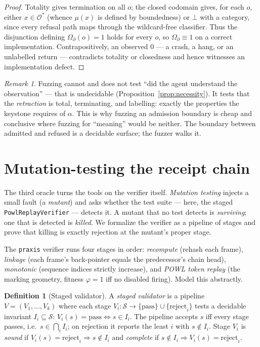 \documentclass[11pt,oneside]{book}
\theoremstyle{definition}
\newtheorem{definition}{Definition}[chapter]
\theoremstyle{plain}
\theoremstyle{remark}
\newtheorem*{remark}{Remark}
\newcommand{\Adm}{\mathcal{O}^{*}}             %
\newcommand{\muop}{\mu}                        %
\newcommand{\adm}{\alpha}                      %
\newcommand{\Rfsl}{\bot}                        %
\newcommand{\Fitness}{\varphi}
\newcommand{\code}[1]{\texttt{#1}}
\begin{document}
\begin{proof}
Totality gives termination on all $o$; the closed codomain gives, for each $o$, either $x\in\Adm$ (whence $\muop(x)$ is defined by boundedness) or $\Rfsl$ with a category, since every refusal path maps through the wildcard-free classifier. %
Thus the disjunction defining $\Omega_\partial(o)=1$ holds for every $o$, so $\Omega_\partial\equiv 1$ on a correct implementation. %
Contrapositively, an observed $0$ --- a crash, a hang, or an unlabelled return --- contradicts totality or closedness and hence witnesses an implementation defect. %
\end{proof}

\begin{remark}
Fuzzing cannot and does not test ``did the agent understand the observation'' --- that is undecidable (Proposition~\ref{prop:necessity}). %
It tests that the \emph{retraction} is total, terminating, and labelling: exactly the properties the keystone requires of $\adm$. %
This is why fuzzing an admission boundary is cheap and conclusive where fuzzing for ``meaning'' would be neither. %
The boundary between admitted and refused is a decidable surface; the fuzzer walks it. %
\end{remark}

\section{Mutation-testing the receipt chain}
The third oracle turns the tools on the verifier itself. %
\emph{Mutation testing} \cite{demillo1978,jia2011} injects a small fault (a \emph{mutant}) and asks whether the test suite --- here, the staged \code{PowlReplayVerifier} --- detects it. %
A mutant that no test detects is \emph{surviving}; one that is detected is \emph{killed}. %
We formalize the verifier as a pipeline of stages and prove that killing is exactly rejection at the mutant's proper stage. %

The \code{praxis} verifier runs four stages in order: \emph{recompute} (rehash each frame), \emph{linkage} (each frame's back-pointer equals the predecessor's chain head), \emph{monotonic} (sequence indices strictly increase), and \emph{POWL token replay} (the marking geometry, fitness $\Fitness=1$ iff no disabled firing). %
Model this abstractly. %

\begin{definition}[Staged validator]\label{def:staged}
A \emph{staged validator} is a pipeline $V=(V_1,\dots,V_k)$ where each stage $V_i:\mathcal{S}\to\{\text{pass}\}\cup\{\text{reject}_i\}$ tests a decidable invariant $I_i\subseteq\mathcal{S}$: $V_i(s)=\text{pass}\iff s\in I_i$. %
The pipeline accepts $s$ iff every stage passes, i.e.\ $s\in\bigcap_i I_i$; on rejection it reports the least $i$ with $s\notin I_i$. %
Stage $V_i$ is \emph{sound} if $V_i(s)=\text{reject}_i\Rightarrow s\notin I_i$ and \emph{complete} if $s\notin I_i\Rightarrow V_i(s)=\text{reject}_i$. %
\end{definition}
\end{document}
